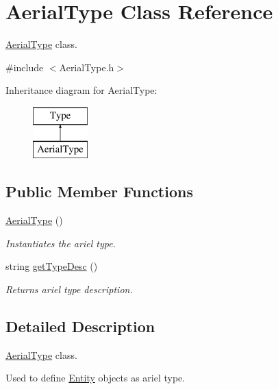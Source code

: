 \hypertarget{classAerialType}{}\section{Aerial\+Type Class Reference}
\label{classAerialType}


\hyperlink{classAerialType}{Aerial\+Type} class.  




{\ttfamily \#include $<$Aerial\+Type.\+h$>$}

Inheritance diagram for Aerial\+Type\+:\begin{figure}[H]
\begin{center}
\leavevmode
\includegraphics[height=2.000000cm]{classAerialType}
\end{center}
\end{figure}
\subsection*{Public Member Functions}
\begin{DoxyCompactItemize}
\item 
\mbox{\label{classAerialType_af31f880cd2a2437544e77d38f60d1c99}} 
\hyperlink{classAerialType_af31f880cd2a2437544e77d38f60d1c99}{Aerial\+Type} ()
\begin{DoxyCompactList}\small\item\em Instantiates the ariel type. \end{DoxyCompactList}\item 
string \hyperlink{classAerialType_a66dd43f2688de9a5eab9c6de0396e9cc}{get\+Type\+Desc} ()
\begin{DoxyCompactList}\small\item\em Returns ariel type description. \end{DoxyCompactList}\end{DoxyCompactItemize}


\subsection{Detailed Description}
\hyperlink{classAerialType}{Aerial\+Type} class. 

Used to define \hyperlink{classEntity}{Entity} objects as ariel type. 

